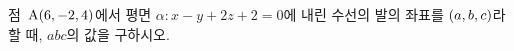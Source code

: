 점~$\mathrm{A}(6{,}\mkern3mu\mathopen{}-2{,}\mkern3mu\mathopen{}4)$에서 평면 $\alpha\colon x-y+2z+2=0$에 내린 수선의 발의 좌표를 $(a{,}\mkern3mu\mathopen{}b{,}\mkern3mu\mathopen{}c)$라 할 때, $abc$의 값을 구하시오.
